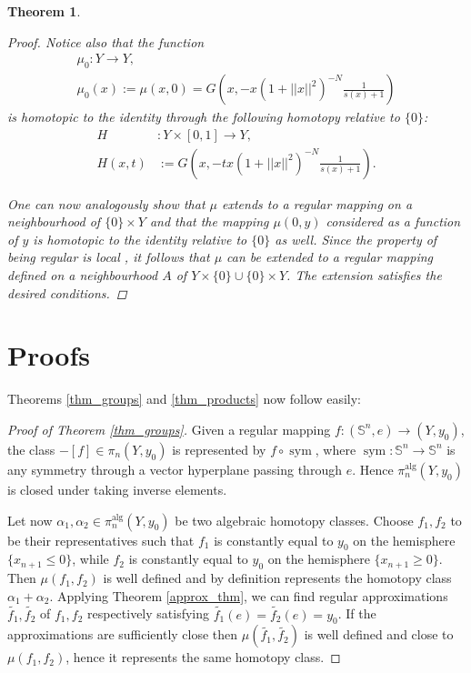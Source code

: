 \documentclass{article}
\theoremstyle{plain}
\newtheorem{thm}{Theorem}[section]
\theoremstyle{definition}
\theoremstyle{remark}
\newcommand{\s}{\mathbb{S}}
\newcommand{\alg}{\mathrm{alg}}
\DeclareMathOperator{\sym}{sym}
\begin{document}
\begin{thm}
\begin{proof}
Notice also that the function 
\begin{gather*}
\mu_0:Y\rightarrow Y, \\
\mu_0(x):=\mu(x,0)=G\left(x,-x(1+||x||^2)^{-N}\frac{1}{s(x)+1}\right)
\end{gather*}
is homotopic to the identity through the following homotopy relative to $\{0\}$:
\begin{align*}
    H&:Y\times [0,1]\rightarrow Y, \\
    H(x,t)&:=G\left(x,-tx(1+||x||^2)^{-N}\frac{1}{s(x)+1}\right).
\end{align*}

One can now analogously show that $\mu$ extends to a regular mapping on a neighbourhood of $\{0\}\times Y$ and that the mapping $\mu(0,y)$ considered as a function of $y$ is homotopic to the identity relative to $\{0\}$ as well. Since the property of being regular is local \cite[Proposition 3.2.3]{bochnakRealAlgebraicGeometry1998}, it follows that $\mu$ can be extended to a regular mapping defined on a neighbourhood $A$ of $Y\times \{0\}\cup \{0\}\times Y$. The extension satisfies the desired conditions.
\end{proof}
\end{thm}

\section{Proofs}

Theorems \ref{thm_groups} and \ref{thm_products} now follow easily:

\begin{proof}[Proof of Theorem \ref{thm_groups}]
Given a regular mapping $f:(\s^n,e)\rightarrow (Y,y_0)$, the class $-[f]\in\pi_n(Y,y_0)$ is represented by $f\circ \sym$, where $\sym:\s^n\rightarrow \s^n$ is any symmetry through a vector hyperplane passing through $e$. Hence $\pi_n^\alg(Y,y_0)$ is closed under taking inverse elements. 

Let now $\alpha_1,\alpha_2\in \pi_n^\alg(Y,y_0)$ be two algebraic homotopy classes. Choose $f_1,f_2$ to be their representatives such that $f_1$ is constantly equal to $y_0$ on the hemisphere $\{x_{n+1}\leq 0\}$, while $f_2$ is constantly equal to $y_0$ on the hemisphere $\{x_{n+1}\geq 0\}$. Then $\mu(f_1, f_2)$ is well defined and by definition represents the homotopy class $\alpha_1+\alpha_2$. Applying Theorem \ref{approx_thm}, we can find regular approximations $\widetilde{f_1},\widetilde{f_2}$ of $f_1,f_2$ respectively satisfying $\widetilde{f_1}(e)=\widetilde{f_2}(e)=y_0$. If the approximations are sufficiently close then $\mu(\widetilde{f_1},\widetilde{f_2})$ is well defined and close to $\mu(f_1,f_2)$, hence it represents the same homotopy class.
\end{proof}
\end{document}

